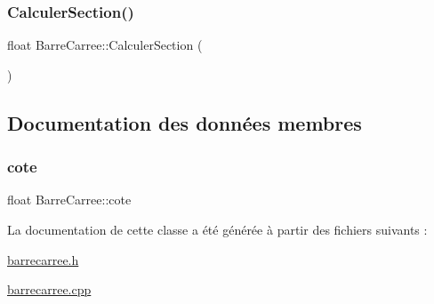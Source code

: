 \mbox{\label{class_barre_carree_a2ae3a05c5e05ea41a775060b83e9a9f6}} 
\subsubsection{\texorpdfstring{Calculer\+Section()}{CalculerSection()}}
{\footnotesize\ttfamily float Barre\+Carree\+::\+Calculer\+Section (\begin{DoxyParamCaption}{ }\end{DoxyParamCaption})}



\subsection{Documentation des données membres}
\mbox{\label{class_barre_carree_adb083da7f685ddf27bbfe006f09f108b}} 
\subsubsection{\texorpdfstring{cote}{cote}}
{\footnotesize\ttfamily float Barre\+Carree\+::cote\hspace{0.3cm}{\ttfamily [private]}}



La documentation de cette classe a été générée à partir des fichiers suivants \+:\begin{DoxyCompactItemize}
\item 
\hyperlink{barrecarree_8h}{barrecarree.\+h}\item 
\hyperlink{barrecarree_8cpp}{barrecarree.\+cpp}\end{DoxyCompactItemize}
